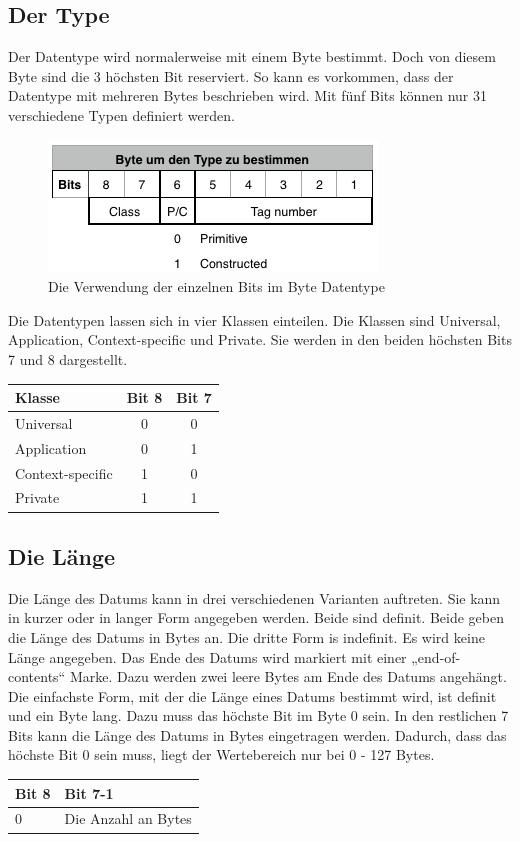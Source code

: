 \documentclass[11pt,a4paper]{article}
\begin{document}
\subsection*{Der Type}
Der Datentype wird normalerweise mit einem Byte bestimmt. Doch von diesem Byte sind die 3 höchsten Bit reserviert. So kann es vorkommen, dass der Datentype mit mehreren Bytes beschrieben wird. Mit fünf Bits können nur 31 verschiedene Typen definiert werden.
\linebreak
\begin{figure}[h]
	\centering
	\includegraphics[scale=1]{Bilder/Datentype-BER}
	\caption{Die Verwendung der einzelnen Bits im Byte Datentype}
\end{figure}
\linebreak
Die Datentypen lassen sich in vier Klassen einteilen. Die Klassen sind Universal, Application, Context-specific und Private. Sie werden in den beiden höchsten Bits 7 und 8 dargestellt.
\linebreak
\begin{center}
	\begin{tabular}{| l | c | c |}
		\hline
		Klasse & Bit 8 & Bit 7\\
		\hline
		Universal & 0 & 0\\
		Application & 0 & 1\\
		Context-specific & 1 & 0\\
		Private & 1 & 1\\
		\hline
	\end{tabular}
\end{center}

\subsection*{Die Länge}
Die Länge des Datums kann in drei verschiedenen Varianten auftreten. Sie kann in kurzer oder in langer Form angegeben werden. Beide sind definit. Beide geben die Länge des Datums in Bytes an. Die dritte Form is indefinit. Es wird keine Länge angegeben. Das Ende des Datums wird markiert mit einer „end-of-contents“ Marke. Dazu werden zwei leere Bytes am Ende des Datums angehängt.
\linebreak
Die einfachste Form, mit der die Länge eines Datums bestimmt wird, ist definit und ein Byte lang. Dazu muss das höchste Bit im Byte 0 sein. In den restlichen 7 Bits kann die Länge des Datums in Bytes eingetragen werden. Dadurch, dass das höchste Bit 0 sein muss, liegt der Wertebereich nur bei 0 - 127 Bytes.
\begin{center}
	\begin{tabular}{| l | l |}
		\hline
		Bit 8 & Bit 7-1\\
		\hline
		0 & Die Anzahl an Bytes\\
		\hline
	\end{tabular}
\end{center}
\end{document}
